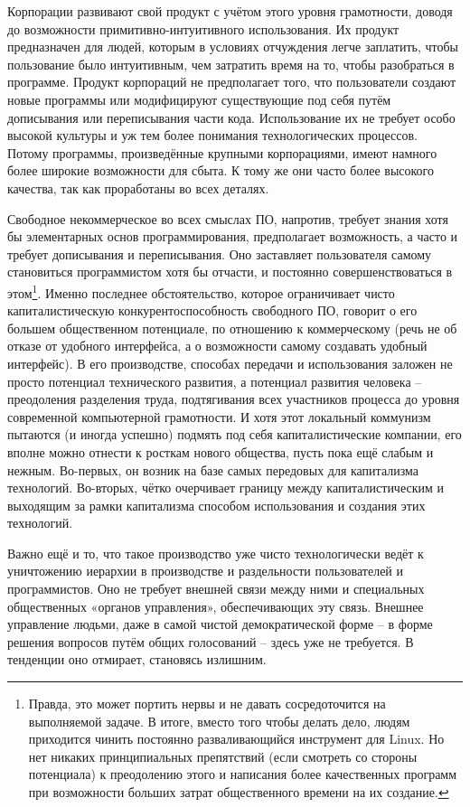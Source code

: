 \documentclass[../main]{subfiles}
\begin{document}
Корпорации развивают свой продукт с учётом этого уровня грамотности, доводя до возможности примитивно-интуитивного использования. Их продукт предназначен для людей, которым в условиях отчуждения легче заплатить, чтобы пользование было интуитивным, чем затратить время на то, чтобы разобраться в программе. Продукт корпораций не предполагает того, что пользователи создают новые программы или модифицируют существующие под себя путём дописывания или переписывания части кода. Использование их не требует особо высокой культуры и уж тем более понимания технологических процессов. Потому программы, произведённые крупными корпорациями, имеют намного более широкие возможности для сбыта. К тому же они часто более высокого качества, так как проработаны во всех деталях.

Свободное некоммерческое во всех смыслах ПО, напротив, требует знания хотя бы элементарных основ программирования, предполагает возможность, а часто и требует дописывания и переписывания. Оно заставляет пользователя самому становиться программистом хотя бы отчасти, и постоянно совершенствоваться в этом\footnote{Правда, это может портить нервы и не давать сосредоточится на выполняемой задаче. В итоге, вместо того чтобы делать дело, людям приходится чинить постоянно разваливающийся инструмент для Linux. Но нет никаких принципиальных препятствий (если смотреть со стороны потенциала) к преодолению этого и написания более качественных программ при возможности больших затрат общественного времени на их создание.}. Именно последнее обстоятельство, которое ограничивает чисто капиталистическую конкурентоспособность свободного ПО, говорит о его большем общественном потенциале, по отношению к коммерческому (речь не об отказе от удобного интерфейса, а о возможности самому создавать удобный интерфейс). В его производстве, способах передачи и использования заложен не просто потенциал технического развития, а потенциал развития человека – преодоления разделения труда, подтягивания всех участников процесса до уровня современной компьютерной грамотности. И хотя этот локальный коммунизм пытаются (и иногда успешно) подмять под себя капиталистические компании, его вполне можно отнести к росткам нового общества, пусть пока ещё слабым и нежным. Во-первых, он возник на базе самых передовых для капитализма технологий. Во-вторых, чётко очерчивает границу между капиталистическим и выходящим за рамки капитализма способом использования и создания этих технологий.

Важно ещё и то, что такое производство уже чисто технологически ведёт к уничтожению иерархии в производстве и раздельности пользователей и программистов. Оно не требует внешней связи между ними и специальных общественных «органов управления», обеспечивающих эту связь. Внешнее управление людьми, даже в самой чистой демократической форме – в форме решения вопросов путём общих голосований – здесь уже не требуется. В тенденции оно отмирает, становясь излишним.
\end{document}
